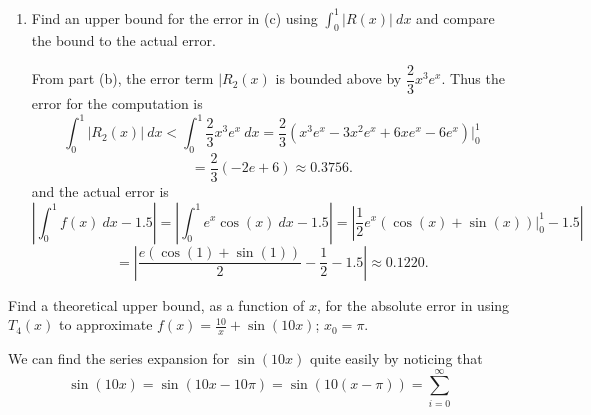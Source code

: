 \documentclass{article}
\theoremstyle{plain} %
\numberwithin{thm}{section} %
\theoremstyle{definition}
\begin{document}
\begin{question}{3}
\begin{enumerate}[label=(\alph*)]
            \item Find an upper bound for the error in (c) using \(\int _0^1 |R(x)|\ dx\) and compare the bound to the actual error.
            
            From part (b), the error term \(|R_2(x)\) is bounded above by \(\dfrac{2}{3}x^3 e^x\). Thus the error for the computation is
            \[
                \int _0^1 |R_2(x)|\ dx < \int _0^1 \dfrac{2}{3}x^3 e^x\ dx = \frac{2}{3}\left( x^3e^x - 3x^2e^x + 6xe^x - 6e^x \right) \Big|_0^1
            \]
            \[
                = \frac{2}{3}(-2e + 6) \approx 0.3756.
            \]
            and the actual error is
            \[
                \left\vert \int _0^1 f(x)\ dx - 1.5 \right\vert = \left\vert \int _0^1 e^x \cos (x)\ dx - 1.5 \right\vert = \left\vert \frac{1}{2}e^x(\cos (x) + \sin (x))\Big|_0^1 - 1.5 \right\vert
            \]
            \[
                = \left\vert \frac{e(\cos (1) + \sin (1))}{2} - \frac{1}{2} - 1.5 \right\vert \approx 0.1220.
            \]
        \end{enumerate}
    \end{question}
    \newpage
    \begin{question}{4}
        Find a theoretical upper bound, as a function of \(x\), for the absolute error in using \(T_4(x)\) to approximate \(f(x) = \frac{10}{x} + \sin(10x)\); \(x_0 = \pi\).

        We can find the series expansion for \(\sin (10x)\) quite easily by noticing that
        \[
            \sin (10x) = \sin (10x - 10\pi) = \sin (10(x - \pi)) = \sum_{i=0}^{\infty} 
        \]
    \end{question}
    \newpage
\end{document}
